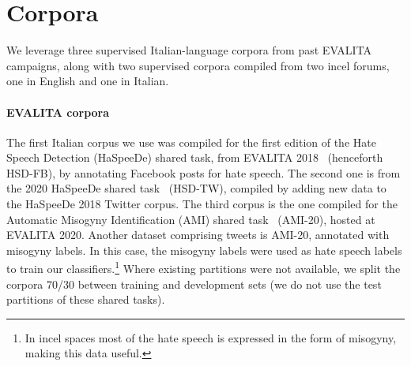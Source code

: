 \documentclass[11pt]{article}
\newcommand{\paolo}[1]{{\color{red} #1}}
\newcommand{\albert}{\mbox{AlBERTo}}
\newcommand{\hsdfb}{\mbox{HSD-FB}}
\newcommand{\hsdtw}{\mbox{HSD-TW}}
\newcommand{\ami}{\mbox{AMI-20}}
\begin{document}

\section{Corpora}
\label{sec:corpora}

We leverage three supervised Italian-language corpora from past EVALITA
campaigns, along with two supervised corpora compiled from two incel forums, one in English and one in Italian.

\paragraph{EVALITA corpora}
The first Italian corpus we use was compiled for the first edition of the Hate Speech Detection (HaSpeeDe) shared task, from EVALITA 2018~\cite{boscoOverviewEVALITA2018} (henceforth \hsdfb), by annotating Facebook posts for hate speech. The second one is from the 2020 HaSpeeDe shared task~\cite{Sanguinetti2020haspeedeeoverview} (\hsdtw), compiled by adding new data to the HaSpeeDe 2018 Twitter corpus. The third corpus is the one compiled for the Automatic Misogyny Identification (AMI) shared task~\cite{fersiniAMIEVALITA2020Automatic2020} (\ami), hosted at EVALITA 2020. \paolo{Another dataset comprising tweets is }\ami, annotated with misogyny labels. \paolo{In this case, the misogyny labels were used as hate speech labels to train our classifiers}.\footnote{In incel spaces most of the hate speech is expressed in the form of misogyny, making this data useful.}
\paolo{Where existing partitions were not available, we split the corpora} 70/30 between training and development sets (we do not use the test partitions of these shared tasks).
\end{document}
